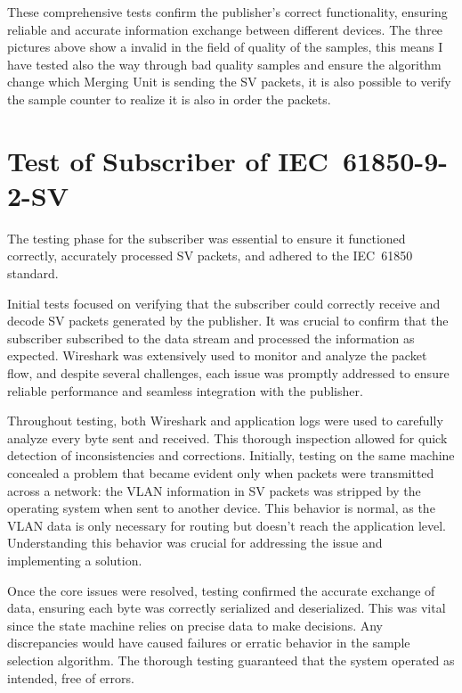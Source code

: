 These comprehensive tests confirm the publisher's correct functionality, ensuring reliable and accurate information exchange between different devices.  The three pictures above show a invalid in the field of quality of the samples, this means I have tested also the way through bad quality samples and ensure the algorithm change which Merging Unit is sending the SV packets, it is also possible to verify the sample counter to realize it is also in order the packets.

\section{Test of Subscriber of IEC~61850-9-2-SV}

The testing phase for the subscriber was essential to ensure it functioned correctly, accurately processed SV packets, and adhered to the IEC~61850 standard.

Initial tests focused on verifying that the subscriber could correctly receive and decode SV packets generated by the publisher. It was crucial to confirm that the subscriber subscribed to the data stream and processed the information as expected. Wireshark was extensively used to monitor and analyze the packet flow, and despite several challenges, each issue was promptly addressed to ensure reliable performance and seamless integration with the publisher.

Throughout testing, both Wireshark and application logs were used to carefully analyze every byte sent and received. This thorough inspection allowed for quick detection of inconsistencies and corrections. Initially, testing on the same machine concealed a problem that became evident only when packets were transmitted across a network: the VLAN information in SV packets was stripped by the operating system when sent to another device. This behavior is normal, as the VLAN data is only necessary for routing but doesn’t reach the application level. Understanding this behavior was crucial for addressing the issue and implementing a solution.

Once the core issues were resolved, testing confirmed the accurate exchange of data, ensuring each byte was correctly serialized and deserialized. This was vital since the state machine relies on precise data to make decisions. Any discrepancies would have caused failures or erratic behavior in the sample selection algorithm. The thorough testing guaranteed that the system operated as intended, free of errors.

